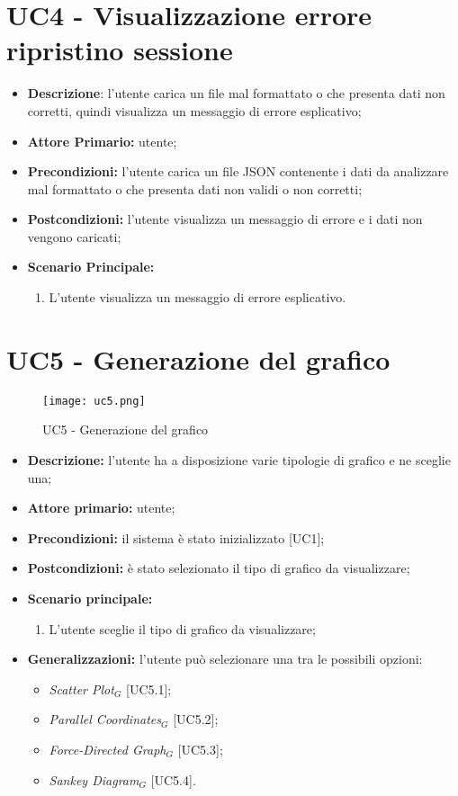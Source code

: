 \section{UC4 - Visualizzazione errore ripristino sessione}
\begin{itemize}
  \item \textbf{Descrizione}: l'utente carica un file mal formattato o che presenta dati non corretti, quindi visualizza un messaggio di errore esplicativo;
  \item \textbf{Attore Primario:} utente;
  \item \textbf{Precondizioni:} l’utente carica un file JSON contenente i dati da analizzare mal formattato o che presenta dati non validi o non corretti;
  \item \textbf{Postcondizioni:} l'utente visualizza un messaggio di errore e i dati non vengono caricati;
  \item \textbf{Scenario Principale:}
  \begin{enumerate}
    \item L'utente visualizza un messaggio di errore esplicativo.
  \end{enumerate}
\end{itemize}

\section{UC5 - Generazione del grafico}
\begin{figure}[H]
 \texttt{[image: uc5.png]}
 \caption{UC5 - Generazione del grafico}
\end{figure}

 \begin{itemize}
     \item \textbf{Descrizione:} l'utente ha a disposizione varie tipologie di grafico e ne sceglie una;
     \item \textbf{Attore primario:} utente;
     \item \textbf{Precondizioni:} il sistema è stato inizializzato [UC1];
     \item \textbf{Postcondizioni:} è stato selezionato il tipo di grafico da visualizzare;
     \item \textbf{Scenario principale:}
     \begin{enumerate}
       \item L'utente sceglie il tipo di grafico da visualizzare;
     \end{enumerate}
     \item \textbf{Generalizzazioni:} l'utente può selezionare una tra le possibili opzioni:
     \begin{itemize}
         \item \textit{Scatter Plot}$_G$ [UC5.1];
         \item \textit{Parallel Coordinates}$_G$ [UC5.2];
         \item \textit{Force-Directed Graph}$_G$ [UC5.3];
         \item \textit{Sankey Diagram}$_G$ [UC5.4].
     \end{itemize}
 \end{itemize}

